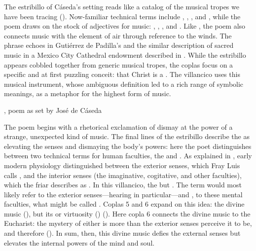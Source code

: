 The estribillo of Cáseda's setting reads like a catalog of the musical tropes
we have been tracing ().
Now-familiar technical terms include , ,
, and , while the poem draws on the stock
of adjectives for music: , ,
, and .
Like , the poem also connects music with the element of
air through reference to the winds.
The phrase  echoes  in Gutiérrez de Padilla's  and the
similar description of sacred music in a Mexico City Cathedral endowment
described in .
While the estribillo appears cobbled together from generic musical tropes, the
coplas focus on a specific and at first puzzling conceit: that Christ is a
.
The villancico uses this musical instrument, whose ambiguous definition led to
a rich range of symbolic meanings, as a metaphor for the highest form of music.

{, poem as set by José de Cáseda}

The poem begins with a rhetorical exclamation of dismay at the power of a
strange, unexpected kind of music.
The final lines of the estribillo describe the  as
elevating the senses and dismaying the body's powers: here the poet
distinguishes between two technical terms for human faculties, the
 and .
As explained in , early modern physiology distinguished
between the exterior senses, which Fray Luis calls , and the interior senses (the imaginative, cogitative, and other
faculties), which the friar describes as .
In this villancico, the   but
.  
The term  would most likely refer to the exterior
senses---hearing in particular---and , to these mental
faculties, what might be called .
Coplas 5 and 6 expand on this idea: the divine music  (), but its  or virtuosity
() 
().
Here copla 6 connects the divine music to the Eucharist: the mystery of either
is more than the exterior senses perceive it to be, and therefore
().
In sum, then, this divine music defies the external senses but elevates the
internal powers of the mind and soul.

